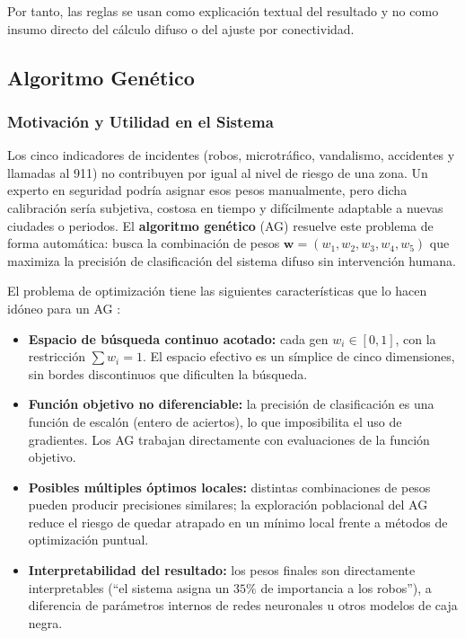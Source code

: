 \documentclass[11pt]{article}
\begin{document}
Por tanto, las reglas se usan como explicación textual del resultado y no como insumo directo del cálculo difuso o del ajuste por conectividad.

\subsection{Algoritmo Genético}

\subsubsection{Motivación y Utilidad en el Sistema}

Los cinco indicadores de incidentes (robos, microtráfico, vandalismo, accidentes y llamadas al 911) no contribuyen por igual al nivel de riesgo de una zona. Un experto en seguridad podría asignar esos pesos manualmente, pero dicha calibración sería subjetiva, costosa en tiempo y difícilmente adaptable a nuevas ciudades o periodos. El \textbf{algoritmo genético} (AG) resuelve este problema de forma automática: busca la combinación de pesos $\mathbf{w} = (w_1, w_2, w_3, w_4, w_5)$ que maximiza la precisión de clasificación del sistema difuso sin intervención humana.

El problema de optimización tiene las siguientes características que lo hacen idóneo para un AG \cite{b2}:

\begin{itemize}
    \item \textbf{Espacio de búsqueda continuo acotado:} cada gen $w_i \in [0, 1]$, con la restricción $\sum w_i = 1$. El espacio efectivo es un símplice de cinco dimensiones, sin bordes discontinuos que dificulten la búsqueda.
    \item \textbf{Función objetivo no diferenciable:} la precisión de clasificación es una función de escalón (entero de aciertos), lo que imposibilita el uso de gradientes. Los AG trabajan directamente con evaluaciones de la función objetivo.
    \item \textbf{Posibles múltiples óptimos locales:} distintas combinaciones de pesos pueden producir precisiones similares; la exploración poblacional del AG reduce el riesgo de quedar atrapado en un mínimo local frente a métodos de optimización puntual.
    \item \textbf{Interpretabilidad del resultado:} los pesos finales son directamente interpretables (``el sistema asigna un $35\%$ de importancia a los robos''), a diferencia de parámetros internos de redes neuronales u otros modelos de caja negra.
\end{itemize}
\end{document}
